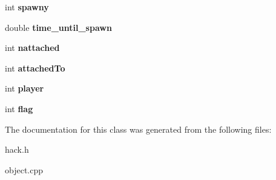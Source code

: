 \begin{DoxyCompactItemize}
\item 
\hypertarget{class_object_a962a545cf1ba17dc15f2d08b2012d968}{int {\bfseries spawny}}\label{class_object_a962a545cf1ba17dc15f2d08b2012d968}

\item 
\hypertarget{class_object_aed601a91f4458261950570d45e5c368f}{double {\bfseries time\-\_\-until\-\_\-spawn}}\label{class_object_aed601a91f4458261950570d45e5c368f}

\item 
\hypertarget{class_object_af0f3383d9cefc68ed8d68207c0972805}{int {\bfseries nattached}}\label{class_object_af0f3383d9cefc68ed8d68207c0972805}

\item 
\hypertarget{class_object_aad5e8ce72a70aa847afde2f496c69b53}{int {\bfseries attached\-To}}\label{class_object_aad5e8ce72a70aa847afde2f496c69b53}

\item 
\hypertarget{class_object_a8e4e31b38cc34a9b0eb8453f5151412f}{int {\bfseries player}}\label{class_object_a8e4e31b38cc34a9b0eb8453f5151412f}

\item 
\hypertarget{class_object_ab51b11311d5cc603dea0a86960512cd7}{int {\bfseries flag}}\label{class_object_ab51b11311d5cc603dea0a86960512cd7}

\end{DoxyCompactItemize}


The documentation for this class was generated from the following files\-:\begin{DoxyCompactItemize}
\item 
hack.\-h\item 
object.\-cpp\end{DoxyCompactItemize}
